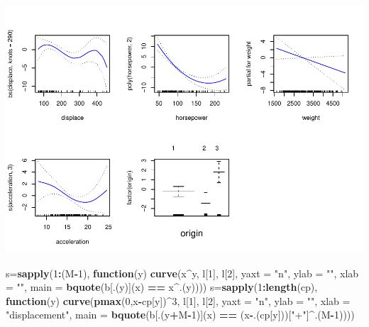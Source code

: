 \documentclass[]{article}
\newenvironment{Shaded}{\begin{snugshade}}{\end{snugshade}}
\newcommand{\KeywordTok}[1]{\textcolor[rgb]{0.13,0.29,0.53}{\textbf{#1}}}
\newcommand{\DataTypeTok}[1]{\textcolor[rgb]{0.13,0.29,0.53}{#1}}
\newcommand{\DecValTok}[1]{\textcolor[rgb]{0.00,0.00,0.81}{#1}}
\newcommand{\StringTok}[1]{\textcolor[rgb]{0.31,0.60,0.02}{#1}}
\newcommand{\ControlFlowTok}[1]{\textcolor[rgb]{0.13,0.29,0.53}{\textbf{#1}}}
\newcommand{\OperatorTok}[1]{\textcolor[rgb]{0.81,0.36,0.00}{\textbf{#1}}}
\newcommand{\NormalTok}[1]{#1}
\begin{document}
\includegraphics{1_files/figure-latex/unnamed-chunk-9-1.pdf}

\begin{Shaded}
\begin{Highlighting}[]
\NormalTok{s=}\KeywordTok{sapply}\NormalTok{(}\DecValTok{1}\OperatorTok{:}\NormalTok{(M}\OperatorTok{-}\DecValTok{1}\NormalTok{), }\ControlFlowTok{function}\NormalTok{(y) }\KeywordTok{curve}\NormalTok{(x}\OperatorTok{^}\NormalTok{y, l[}\DecValTok{1}\NormalTok{], l[}\DecValTok{2}\NormalTok{], }\DataTypeTok{yaxt =} \StringTok{"n"}\NormalTok{,}
 \DataTypeTok{ylab =} \StringTok{""}\NormalTok{, }\DataTypeTok{xlab =} \StringTok{""}\NormalTok{, }\DataTypeTok{main =} \KeywordTok{bquote}\NormalTok{(b[.(y)](x) }\OperatorTok{==}\StringTok{ }\NormalTok{x}\OperatorTok{^}\NormalTok{.(y))))}
\NormalTok{s=}\KeywordTok{sapply}\NormalTok{(}\DecValTok{1}\OperatorTok{:}\KeywordTok{length}\NormalTok{(cp), }\ControlFlowTok{function}\NormalTok{(y) }\KeywordTok{curve}\NormalTok{(}\KeywordTok{pmax}\NormalTok{(}\DecValTok{0}\NormalTok{,x}\OperatorTok{-}\NormalTok{cp[y])}\OperatorTok{^}\DecValTok{3}\NormalTok{, l[}\DecValTok{1}\NormalTok{], l[}\DecValTok{2}\NormalTok{], }\DataTypeTok{yaxt =} \StringTok{"n"}\NormalTok{,}
 \DataTypeTok{ylab =} \StringTok{""}\NormalTok{, }\DataTypeTok{xlab =} \StringTok{"displacement"}\NormalTok{, }\DataTypeTok{main =} \KeywordTok{bquote}\NormalTok{(b[.(y}\OperatorTok{+}\NormalTok{M}\OperatorTok{-}\DecValTok{1}\NormalTok{)](x) }\OperatorTok{==}\StringTok{ }\NormalTok{(x}\OperatorTok{-}\NormalTok{.(cp[y]))[}\StringTok{"+"}\NormalTok{]}\OperatorTok{^}\NormalTok{.(M}\OperatorTok{-}\DecValTok{1}\NormalTok{))))}
\end{Highlighting}
\end{Shaded}
\end{document}
